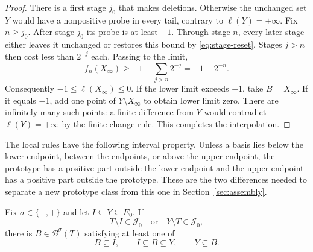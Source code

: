 \begin{proof}
There is a first stage $j_0$ that makes deletions. Otherwise the
unchanged set $Y$ would have a nonpositive probe in every tail,
contrary to $\ell(Y)=+\infty$. Fix $n\ge j_0$. After stage $j_0$ its
probe is at least $-1$. Through stage $n$, every later stage either
leaves it unchanged or restores this bound by \eqref{eq:stage-reset}.
Stages $j>n$ then cost less than $2^{-j}$ each. Passing to the limit,
\[
 f_n(X_\infty)\ge-1-\sum_{j>n}2^{-j}=-1-2^{-n}.
\]
Consequently $-1\le\ell(X_\infty)\le0$. If the lower limit exceeds
$-1$, take $B=X_\infty$. If it equals $-1$, add one point of
$Y\setminus X_\infty$ to obtain lower limit zero. There are infinitely
many such points: a finite difference from $Y$ would contradict
$\ell(Y)=+\infty$ by the finite-change rule. This completes the
interpolation.
\end{proof}

The local rules have the following interval property. Unless a basis
lies below the lower endpoint, between the endpoints, or above the upper
endpoint, the prototype has a positive part outside the lower endpoint
and the upper endpoint has a positive part outside the prototype.
These are the two differences needed to separate a new prototype class
from this one in Section~\ref{sec:assembly}.

\begin{proposition}
\label{prop:local-intervals}
Fix $\sigma\in\{-,+\}$ and let $I\subseteq Y\subseteq E_0$.
If
\[
 T\setminus I\in\mathcal J_0
 \quad\text{or}\quad
 Y\setminus T\in\mathcal J_0,
\]
there is $B\in\mathcal B^\sigma(T)$ satisfying at least one of
\begin{equation}\label{eq:local-alternatives}
 B\subseteq I,\qquad I\subseteq B\subseteq Y,
 \qquad Y\subseteq B.
\end{equation}
\end{proposition}

